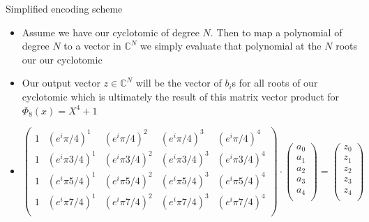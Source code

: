 \documentclass{beamer}
\begin{document}
\begin{frame}{Simplified encoding scheme}
	\begin{itemize}[<+->]
		\item Assume we have our cyclotomic of degree $N$. Then to map a polynomial of degree $N$ to
		a vector in $\mathbb{C}^N$ we simply evaluate that polynomial at the $N$ roots our our cyclotomic
		\item Our output vector $z \in \mathbb{C}^N$ will be the vector of $b_i$s for all roots of our cyclotomic
		which is ultimately the result of this matrix vector product for $\Phi_8(x) = X^4 + 1$
		\item 
		\begin{center}
			\[
			\begin{pmatrix}
				1 & (e^i\pi/4)^1 &  (e^i\pi/4)^2 &  (e^i\pi/4)^3 & (e^i\pi/4)^4\\  
				1 & (e^i\pi 3/4)^1 &  (e^i\pi 3/4)^2 &  (e^i\pi 3/4)^3 & (e^i\pi 3/4)^4\\  
				1 & (e^i\pi 5/4)^1 &  (e^i\pi 5/4)^2 &  (e^i\pi 5/4)^3 & (e^i\pi 5/4)^4\\  
				1 & (e^i\pi 7/4)^1 &  (e^i\pi 7/4)^2 &  (e^i\pi 7/4)^3 & (e^i\pi 7/4)^4\\  
			\end{pmatrix} \cdot 
			\begin{pmatrix}
				a_0\\
				a_1\\
				a_2\\
				a_3\\
				a_4\\
			\end{pmatrix} =
			\begin{pmatrix}
				z_0\\
				z_1\\
				z_2\\
				z_3\\
				z_4\\
			\end{pmatrix}
			\]
		\end{center}
	\end{itemize}
\end{frame}
\end{document}
